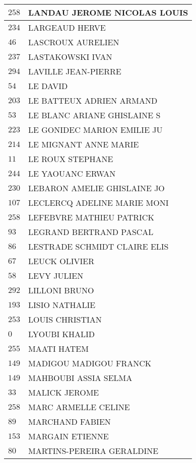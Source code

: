 \begin{xltabular}{\linewidth}{|l|X|}
    \hline
    $258$ & LANDAU JEROME NICOLAS LOUIS \\
    \hline
    $234$ & LARGEAUD HERVE \\
    \hline
    $46$ & LASCROUX AURELIEN \\
    \hline
    $237$ & LASTAKOWSKI IVAN \\
    \hline
    $294$ & LAVILLE JEAN-PIERRE \\
    \hline
    $54$ & LE DAVID \\
    \hline
    $203$ & LE BATTEUX ADRIEN ARMAND \\
    \hline
    $53$ & LE BLANC ARIANE GHISLAINE S \\
    \hline
    $223$ & LE GONIDEC MARION EMILIE JU \\
    \hline
    $214$ & LE MIGNANT ANNE MARIE \\
    \hline
    $11$ & LE ROUX STEPHANE \\
    \hline
    $244$ & LE YAOUANC ERWAN \\
    \hline
    $230$ & LEBARON AMELIE GHISLAINE JO \\
    \hline
    $107$ & LECLERCQ ADELINE MARIE MONI \\
    \hline
    $258$ & LEFEBVRE MATHIEU PATRICK \\
    \hline
    $93$ & LEGRAND BERTRAND PASCAL \\
    \hline
    $86$ & LESTRADE SCHMIDT CLAIRE ELIS \\
    \hline
    $67$ & LEUCK OLIVIER \\
    \hline
    $58$ & LEVY JULIEN \\
    \hline
    $292$ & LILLONI BRUNO \\
    \hline
    $193$ & LISIO NATHALIE \\
    \hline
    $253$ & LOUIS CHRISTIAN \\
    \hline
    $0$ & LYOUBI KHALID \\
    \hline
    $255$ & MAATI HATEM \\
    \hline
    $149$ & MADIGOU MADIGOU FRANCK \\
    \hline
    $149$ & MAHBOUBI ASSIA SELMA \\
    \hline
    $33$ & MALICK JEROME \\
    \hline
    $258$ & MARC ARMELLE CELINE \\
    \hline
    $89$ & MARCHAND FABIEN \\
    \hline
    $153$ & MARGAIN ETIENNE \\
    \hline
    $80$ & MARTINS-PEREIRA GERALDINE \\

\end{xltabular}
